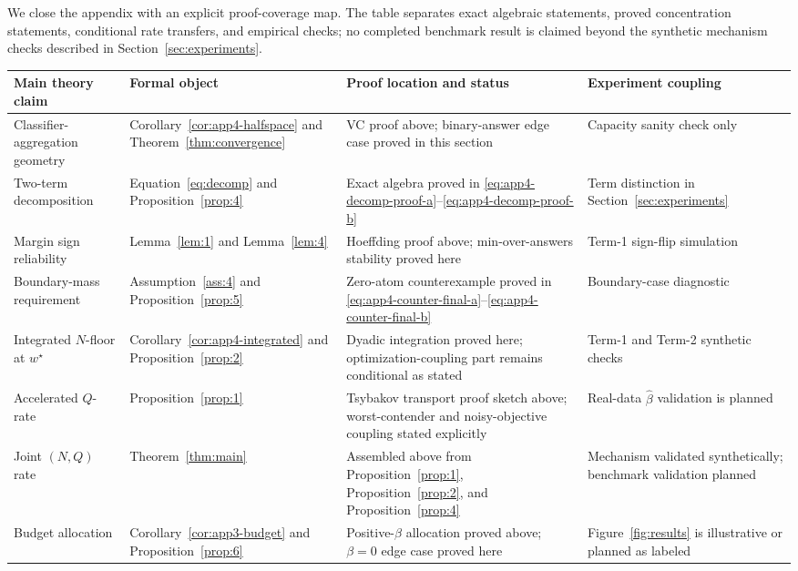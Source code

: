 \documentclass{article} %
\begin{document}
We close the appendix with an explicit proof-coverage map.  The table separates exact algebraic statements, proved concentration statements, conditional rate transfers, and empirical checks; no completed benchmark result is claimed beyond the synthetic mechanism checks described in Section~\ref{sec:experiments}.

\begin{table}[t]
\centering
\small
\begin{tabular}{p{}p{}p{}p{}}
\toprule
Main theory claim & Formal object & Proof location and status & Experiment coupling \\
\midrule
Classifier-aggregation geometry & Corollary~\ref{cor:app4-halfspace} and Theorem~\ref{thm:convergence} & VC proof above; binary-answer edge case proved in this section & Capacity sanity check only \\
Two-term decomposition & Equation~\eqref{eq:decomp} and Proposition~\ref{prop:4} & Exact algebra proved in \eqref{eq:app4-decomp-proof-a}--\eqref{eq:app4-decomp-proof-b} & Term distinction in Section~\ref{sec:experiments} \\
Margin sign reliability & Lemma~\ref{lem:1} and Lemma~\ref{lem:4} & Hoeffding proof above; min-over-answers stability proved here & Term-1 sign-flip simulation \\
Boundary-mass requirement & Assumption~\ref{ass:4} and Proposition~\ref{prop:5} & Zero-atom counterexample proved in \eqref{eq:app4-counter-final-a}--\eqref{eq:app4-counter-final-b} & Boundary-case diagnostic \\
Integrated \(N\)-floor at \(w^\star\) & Corollary~\ref{cor:app4-integrated} and Proposition~\ref{prop:2} & Dyadic integration proved here; optimization-coupling part remains conditional as stated & Term-1 and Term-2 synthetic checks \\
Accelerated \(Q\)-rate & Proposition~\ref{prop:1} & Tsybakov transport proof sketch above; worst-contender and noisy-objective coupling stated explicitly & Real-data \(\widehat\beta\) validation is planned \\
Joint \((N,Q)\) rate & Theorem~\ref{thm:main} & Assembled above from Proposition~\ref{prop:1}, Proposition~\ref{prop:2}, and Proposition~\ref{prop:4} & Mechanism validated synthetically; benchmark validation planned \\
Budget allocation & Corollary~\ref{cor:app3-budget} and Proposition~\ref{prop:6} & Positive-\(\beta\) allocation proved above; \(\beta=0\) edge case proved here & Figure~\ref{fig:results} is illustrative or planned as labeled \\

\end{tabular}
\end{table}
\end{document}
